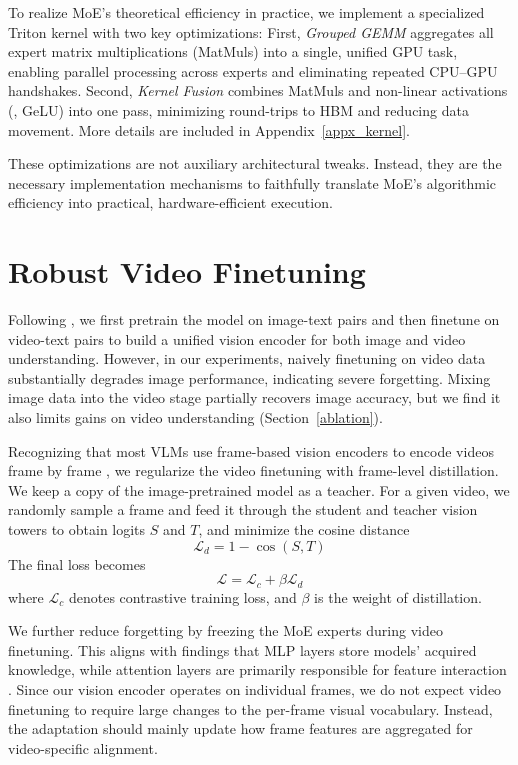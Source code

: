 \documentclass[runningheads]{llncs}
\begin{document}
To realize MoE’s theoretical efficiency in practice, we implement a specialized Triton \cite{triton} kernel with two key optimizations: First, \textit{Grouped GEMM} aggregates all expert matrix multiplications (MatMuls) into a single, unified GPU task, enabling parallel processing across experts and eliminating repeated CPU–GPU handshakes. Second, \textit{Kernel Fusion} combines MatMuls and non-linear activations (\eg, GeLU) into one pass, minimizing round-trips to HBM and reducing data movement. More details are included in Appendix~\ref{appx_kernel}.

These optimizations are not auxiliary architectural tweaks. Instead, they are the necessary implementation mechanisms to faithfully translate MoE’s algorithmic efficiency into practical, hardware-efficient execution.

\section{Robust Video Finetuning}
\label{video_ft}

Following \cite{pe}, we first pretrain the model on image-text pairs and then finetune on video-text pairs to build a unified vision encoder for both image and video understanding. However, in our experiments, naively finetuning on video data substantially degrades image performance, indicating severe forgetting. Mixing image data into the video stage partially recovers image accuracy, but we find it also limits gains on video understanding (Section~\ref{ablation}).

Recognizing that most VLMs use frame-based vision encoders to encode videos frame by frame \cite{plm,omnivinci}, we regularize the video finetuning with frame-level distillation. We keep a copy of the image-pretrained model as a teacher. For a given video, we randomly sample a frame and feed it through the student and teacher vision towers to obtain logits $S$ and $T$, and minimize the cosine distance 
\begin{equation}
\label{similarity}
    \mathcal{L}_d = 1 - \cos(S, T)
\end{equation}
The final loss becomes
\begin{equation}
    \mathcal{L}=\mathcal{L}_c+\beta\mathcal{L}_d
\end{equation}
where $\mathcal{L}_c$ denotes contrastive training loss, and $\beta$ is the weight of distillation.

We further reduce forgetting by freezing the MoE experts during video finetuning. This aligns with findings that MLP layers store models' acquired knowledge, while attention layers are primarily responsible for feature interaction \cite{attn_insights}. Since our vision encoder operates on individual frames, we do not expect video finetuning to require large changes to the per-frame visual vocabulary. Instead, the adaptation should mainly update how frame features are aggregated for video-specific alignment. 
\end{document}
